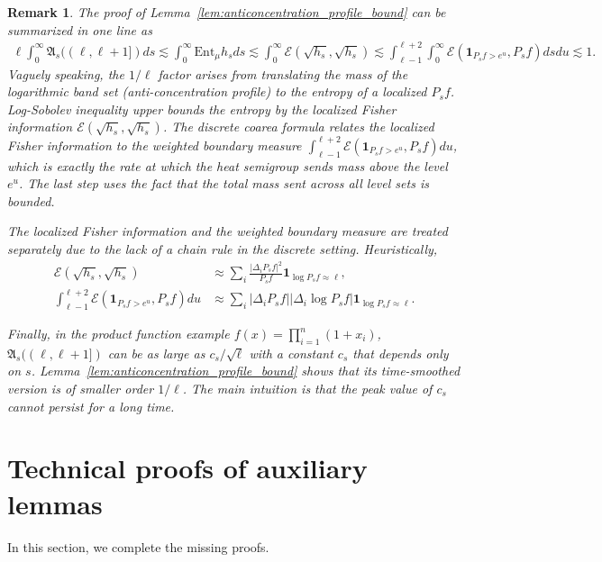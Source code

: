 \documentclass[11pt]{article}
\newcommand{\fA}{\mathfrak{A}}
\newcommand{\dirichlet}{\mathcal{E}}
\theoremstyle{named}
\theoremstyle{plain}
\newtheorem{remark}{Remark}
\newcommand{\Ent}{\text{Ent}}
\newcommand{\abss}[1]{\left| #1 \right |}
\begin{document}
\begin{remark}
  The proof of Lemma~\ref{lem:anticoncentration_profile_bound} can be summarized in one line as
  \begin{align*}
    \ell \int_0^\infty \fA_{s} ((\ell, \ell+1]) ds \lesssim  \int_0^\infty \Ent_\mu h_s ds  \lesssim \int_0^\infty \dirichlet(\sqrt{h_s}, \sqrt{h_s}) \lesssim \int_{\ell-1}^{\ell+2} \int_0^\infty \dirichlet(\mathbf{1}_{P_s f > e^{u}}, P_s f) ds du \lesssim 1.
  \end{align*}
  Vaguely speaking, the $1/\ell$ factor arises from translating the mass of the logarithmic band set (anti-concentration profile) to the entropy of a localized $P_s f$. Log-Sobolev inequality upper bounds the entropy by the localized Fisher information $\dirichlet(\sqrt{h_s}, \sqrt{h_s})$. The discrete coarea formula relates the localized Fisher information to the weighted boundary measure $\int_{\ell-1}^{\ell+2}\dirichlet(\mathbf{1}_{P_s f > e^{u}}, P_s f) du$, which is exactly the rate at which the heat semigroup sends mass above the level $e^{u}$. The last step uses the fact that the total mass sent across all level sets is bounded.

  The localized Fisher information and the weighted boundary measure are treated separately due to the lack of a chain rule in the discrete setting. Heuristically,
  \begin{align*}
    \dirichlet(\sqrt{h_s}, \sqrt{h_s}) &\approx \sum_i \frac{\abss{\Delta_i P_s f}^2}{P_s f } \mathbf{1}_{\log P_s f \approx \ell}, \\
    \int_{\ell-1}^{\ell+2} \dirichlet(\mathbf{1}_{P_s f > e^{u}}, P_s f) du &\approx \sum_i \abss{\Delta_i P_s f} \abss{\Delta_i \log P_s f} \mathbf{1}_{\log P_s f \approx \ell}.
  \end{align*}

  Finally, in the product function example $f(x) = \prod_{i=1}^n (1+x_i)$, $\fA_{s} ((\ell, \ell+1])$ can be as large as $c_s /\sqrt{\ell}$ with a constant $c_s$ that depends only on $s$. Lemma~\ref{lem:anticoncentration_profile_bound} shows that its time-smoothed version is of smaller order $1/\ell$. The main intuition is that the peak value of $c_s$ cannot persist for a long time.
\end{remark}

\section{Technical proofs of auxiliary lemmas}
In this section, we complete the missing proofs. 
\end{document}
